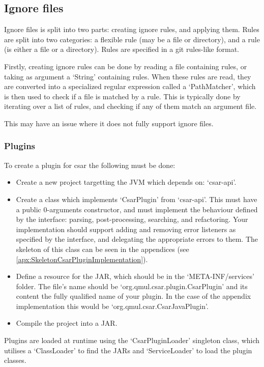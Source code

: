 \documentclass[12pt, letterpaper]{article}
\begin{document}
\subsection{Ignore files}
Ignore files is split into two parts: creating ignore rules, and applying them.
Rules are split into two categories: a flexible rule (may be a file or directory), and a rule (is either a file or a directory).
Rules are specified in a git rules-like format.

Firstly, creating ignore rules can be done by reading a file containing rules, or taking as argument a `String' containing rules.
When these rules are read, they are converted into a specialized regular expression called a `PathMatcher', which is then used to check if a file is matched by a rule.
This is typically done by iterating over a list of rules, and checking if any of them match an argument file.

This may have an issue where it does not fully support ignore files.

\subsubsection{Plugins}
To create a plugin for csar the following must be done:
\begin{itemize}
  \item Create a new project targetting the JVM which depends on: `csar-api'.
  \item Create a class which implements `CsarPlugin' from `csar-api'.
  This must have a public 0-arguments constructor, and must implement the behaviour defined by the interface: parsing, post-processing, searching, and refactoring.
  Your implementation should support adding and removing error listeners as specified by the interface, and delegating the appropriate errors to them.
  The skeleton of this class can be seen in the appendices (see \ref{apx:SkeletonCsarPluginImplementation}).
  \item Define a resource for the JAR, which should be in the `META-INF/services' folder.
  The file's name should be `org.qmul.csar.plugin.CsarPlugin' and its content the fully qualified name of your plugin.
  In the case of the appendix implementation this would be `org.qmul.csar.CsarJavaPlugin'.
  \item Compile the project into a JAR.
\end{itemize}

Plugins are loaded at runtime using the `CsarPluginLoader' singleton class, which utilises a `ClassLoader' to find the JARs and `ServiceLoader' to load the plugin classes.
\end{document}
